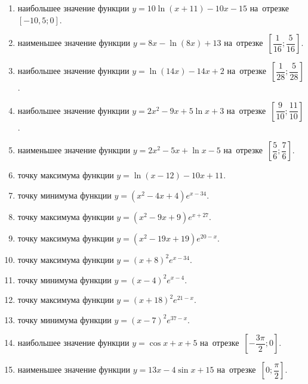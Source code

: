 \documentclass[a4paper,10pt]{article}
\begin{document}
\begin{enumerate}
\item {} наибольшее значение функции $y = 10\ln \left(x+11\right)-10x -15$ на~отрезке~$\left[-10,5;0\right]$.

\item {} наименьшее значение функции $y = 8x-\ln \left(8x\right)+13$ на~отрезке~$\left[\dfrac{1}{16};\dfrac{5}{16}\right]$.

\item {} наибольшее значение функции $y = \ln \left(14x\right)-14x+2$ на~отрезке~$\left[\dfrac{1}{28};\dfrac{5}{28}\right]$.

\item {} наибольшее значение функции $y=2x^2-9x+5\ln x+3$ на~отрезке~$\left[\dfrac{9}{10};\dfrac{11}{10}\right]$.

\item {} наименьшее значение функции $y=2x^2-5x+\ln x-5$ на~отрезке~$\left[\dfrac{5}{6};\dfrac{7}{6}\right]$.

\item {} точку максимума функции $y=\ln \left(x-12\right)-10x+11$.

\item {} точку минимума функции $y=\left(x^2-4x+4\right)e^{x-34}$.

\item {} точку максимума функции $y=\left(x^2-9x+9\right)e^{x+27}$.

\item {} точку максимума функции $y=\left(x^2-19x+19\right)e^{20-x}$.

\item {} точку максимума функции $y=\left(x +8\right)^2e^{x-34}$.

\item {} точку минимума функции $y=\left(x -4\right)^2e^{x-4}$.

\item {} точку максимума функции $y=\left(x +18\right)^2e^{21-x}$.

\item {} точку минимума функции $y=\left(x -7\right)^2e^{37-x}$.

\item {} наибольшее значение функции $y=\cos x+x +5$ на~отрезке~$\left[-\dfrac{3\pi }{2};0\right]$.

\item {} наименьшее значение функции $y=13x-4\sin x +15$ на~отрезке~$\left[0;\dfrac{\pi }{2}\right]$.


\end{enumerate}
\end{document}

